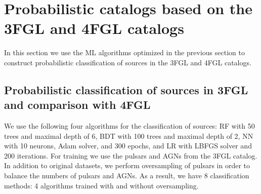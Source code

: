 \section{Probabilistic catalogs based on the 3FGL and 4FGL catalogs}

In this section we use the ML algorithms optimized in the previous section to construct probabilistic
classification of sources in the 3FGL and 4FGL catalogs.


\subsection{Probabilistic classification of sources in 3FGL and comparison with 4FGL}


We use the following four algorithms for the classification of sources: RF with 50 trees and maximal depth of 6, BDT with 100 trees and maximal depth of 2, NN with 10 neurons, Adam solver, and 300 epochs, and LR with LBFGS solver and 200 iterations. 
For training we use the pulsars and AGNs from the 3FGL catalog. In addition to original datasets, we perform oversampling of pulsars in order to balance the numbers of pulsars and AGNs.
As a result, we have 8 classification methods: 4 algorithms trained with and without oversampling.


